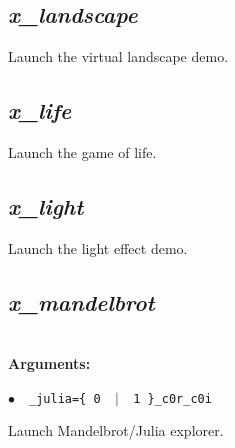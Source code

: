 \documentclass[a4paper,10.5pt,twoside]{book}
\def\comma{\discretionary{,}{}{,}}
\newcommand{\Cb}[1]{\textcolor{cb}{#1}}
\begin{document}
\subsection{\emph{x\_landscape} }\vspace*{-0.7em}
Launch the virtual landscape demo.


\subsection{\emph{x\_life} }\vspace*{-0.7em}
Launch the game of life.


\subsection{\emph{x\_light} }\vspace*{-0.7em}
Launch the light effect demo.


\subsection{\emph{x\_mandelbrot} }\vspace*{-0.7em}
~\\\textbf{\Cb{Arguments: }}\begin{flushleft}
{\small \Cb{\hspace*{0.5cm}$\bullet$~~\texttt{\_julia=\{ 0 ~$|$~ 1 \}{\comma}\_c0r{\comma}\_c0i}}}\end{flushleft}
Launch Mandelbrot/Julia explorer.
\end{document}
